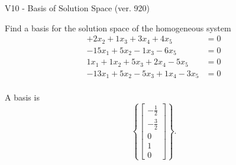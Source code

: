\begin{exercise}
  \begin{exerciseTitle}V10 - Basis of Solution Space (ver. 920)\end{exerciseTitle}
  \begin{exerciseStatement}
    Find a basis for the solution space of the homogeneous system 
\begin{align*}
 + 2 x_ 2 + 1 x_ 3 + 3 x_ 4 + 4 x_ 5 &= 0  \\ 
  -15 x_ 1 + 5 x_ 2 -1 x_ 3 -6 x_ 5 &= 0  \\ 
  1 x_ 1 + 1 x_ 2 + 5 x_ 3 + 2 x_ 4 -5 x_ 5 &= 0  \\ 
  -13 x_ 1 + 5 x_ 2 -5 x_ 3 + 1 x_ 4 -3 x_ 5 &= 0  \\ 
 \end{align*}


 
  \end{exerciseStatement}

  \begin{exerciseAnswer}
   A basis is   
\[\left\{\left[\begin{array}{c}
-\frac{1}{2} \\
-\frac{3}{2} \\
0 \\
1 \\
0
\end{array}\right]\right\}.\]

  


  \end{exerciseAnswer}
\end{exercise}